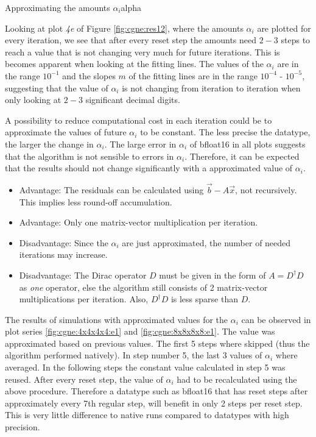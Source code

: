 \documentclass{article}
\theoremstyle{plain} %
\theoremstyle{convention} %
\theoremstyle{remark} %
\numberwithin{equation}{section}
\begin{document}
\begin{proposal}{Approximating the amounts $\alpha_i$}{alpha}

Looking at plot \textit{4e} of Figure \ref{fig:cgne:res12}, where the amounts $\alpha_i$ are plotted for every iteration, we see that after every reset step the amounts need $2-3$ steps to reach a value that is not changing very much for future iterations. This is becomes apparent when looking at the fitting lines. The values of the $\alpha_i$ are in the range $10^{-1}$ and the slopes $m$ of the fitting lines are in the range $10^{-4}$ - $10^{-5}$, suggesting that the value of $\alpha_i$ is not changing from iteration to iteration when only looking at $2-3$ significant decimal digits.

A possibility to reduce computational cost in each iteration could be to approximate the values of future $\alpha_i$ to be constant. The less precise the datatype, the larger the change in $\alpha_i$. The large error in $\alpha_i$ of \gls{bfloat16} in all plots suggests that the algorithm is not sensible to errors in $\alpha_i$. Therefore, it can be expected that the results should not change significantly with a approximated value of $\alpha_i$.

\begin{itemize}
    \item Advantage: The residuals can be calculated using $\vec{b} - A \vec{x}$, not recursively. This implies less round-off accumulation.
    \item Advantage: Only one matrix-vector multiplication per iteration.
    \item Disadvantage: Since the $\alpha_i$ are just approximated, the number of needed iterations may increase.
    \item Disadvantage: The Dirac operator $D$ must be given in the form of $A = D^{\dagger} D$ as \textit{one} operator, else the algorithm still consists of \num{2} matrix-vector multiplications per iteration. Also, $D^{\dagger} D$ is less sparse than $D$.
\end{itemize}

The results of simulations with approximated values for the $\alpha_i$ can be observed in plot series \ref{fig:cgne:4x4x4x4:e1} and \ref{fig:cgne:8x8x8x8:e1}. The value was approximated based on previous values. The first \num{5} steps where skipped (thus the algorithm performed natively). In step number \num{5}, the last \num{3} values of $\alpha_i$ where averaged. In the following steps the constant value calculated in step \num{5} was reused. After every reset step, the value of $\alpha_i$ had to be recalculated using the above procedure. Therefore a datatype such as \gls{bfloat16} that has reset steps after approximately every \num{7}th regular step, will benefit in only \num{2} steps per reset step. This is very little difference to native runs compared to datatypes with high precision.


\end{proposal}
\end{document}
